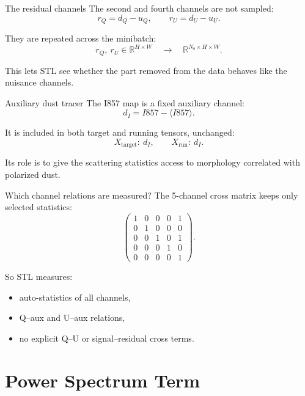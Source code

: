 \documentclass[aspectratio=169,11pt]{beamer}
\begin{document}
\begin{frame}[fragile]{The residual channels}
The second and fourth channels are not sampled:
\[
  r_Q=d_Q-u_Q,\qquad r_U=d_U-u_U.
\]

\vspace{0.25em}
They are repeated across the minibatch:
\[
  r_Q,\ r_U \in \mathbb{R}^{H\times W}
  \quad\longrightarrow\quad
  \mathbb{R}^{N_b\times H\times W}.
\]

\vspace{0.25em}
This lets STL see whether the part removed from the data behaves like the nuisance channels.
\end{frame}

\begin{frame}[fragile]{Auxiliary dust tracer}
The I857 map is a fixed auxiliary channel:
\[
  d_I = I857 - \langle I857\rangle.
\]

\vspace{0.25em}
It is included in both target and running tensors, unchanged:
\[
  X_{\mathrm{target}}:\ d_I,\qquad X_{\mathrm{run}}:\ d_I.
\]

\vspace{0.25em}
Its role is to give the scattering statistics access to morphology correlated with polarized dust.
\end{frame}

\begin{frame}[fragile]{Which channel relations are measured?}
The 5-channel cross matrix keeps only selected statistics:
\[
\begin{pmatrix}
1&0&0&0&1\\
0&1&0&0&0\\
0&0&1&0&1\\
0&0&0&1&0\\
0&0&0&0&1
\end{pmatrix}.
\]

\vspace{0.25em}
So STL measures:
\begin{itemize}
  \item auto-statistics of all channels,
  \item Q--aux and U--aux relations,
  \item no explicit Q--U or signal--residual cross terms.
\end{itemize}
\end{frame}

\section{Power Spectrum Term}
\end{document}
